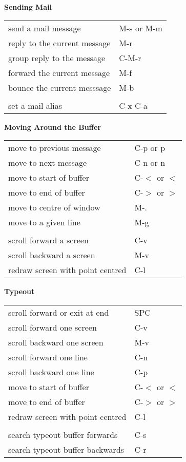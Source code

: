 \documentclass[10pt,a4paper,landscape]{article}
\begin{document}
\begin{multicols}{3}
  {\large \textbf{Sending Mail}}
  \nopagebreak

  \begin{tabular}{p{2.00in}p{0.80in}}
    send a mail message & M-s or M-m \\
    reply to the current message & M-r \\
    group reply to the message & C-M-r \\
    forward the current message & M-f \\
    bounce the current messsage & M-b \\
    & \\
    set a mail alias & C-x C-a \\
  \end{tabular}
  \vfill

  {\large \textbf{Moving Around the Buffer}}
  \nopagebreak

  \begin{tabular}{p{2.00in}p{0.80in}}
    move to previous message & C-p or p \\
    move to next message & C-n or n \\
    move to start of buffer & C-$<$ or $<$ \\
    move to end of buffer & C-$>$ or $>$ \\
    move to centre of window & M-. \\
    move to a given line & M-g \\
    & \\
    scroll forward a screen & C-v \\
    scroll backward a screen & M-v \\
    redraw screen with point centred & C-l \\
  \end{tabular}
  \vfill
  
  {\large \textbf{Typeout}}
  \nopagebreak

  \begin{tabular}{p{2.00in}p{0.80in}}
    scroll forward or exit at end & SPC \\
    scroll forward one screen & C-v \\
    scroll backward one screen & M-v \\
    scroll forward one line & C-n \\
    scroll backward one line & C-p \\
    move to start of buffer & C-$<$ or $<$ \\
    move to end of buffer & C-$>$ or $>$ \\
    redraw screen with point centred & C-l \\
    & \\
    search typeout buffer forwards & C-s \\
    search typeout buffer backwards & C-r \\
  \end{tabular}
  \vfill  


\end{multicols}
\end{document}
